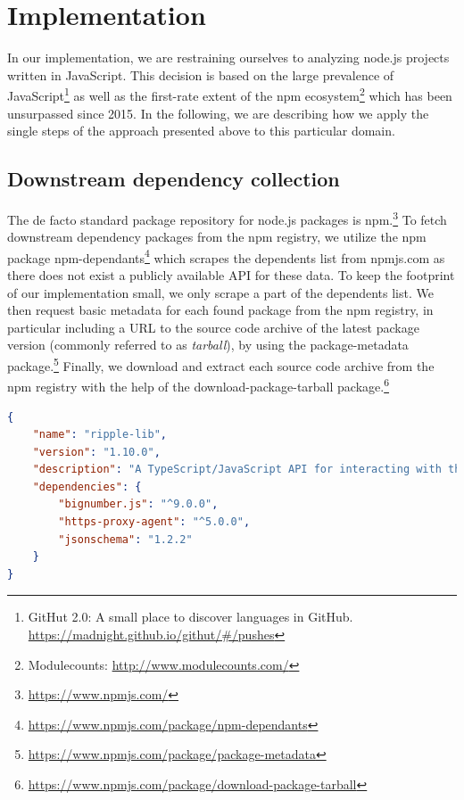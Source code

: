 \section{Implementation}
\label{sec:implementation}

In our implementation, we are restraining ourselves to analyzing node.js projects written in JavaScript.
This decision is based on the large prevalence of JavaScript\footnote{GitHut 2.0: A small place to discover languages in GitHub. \url{https://madnight.github.io/githut/\#/pushes}} as well as the first-rate extent of the npm ecosystem\footnote{Modulecounts: \url{http://www.modulecounts.com/}} which has been unsurpassed since 2015.
In the following, we are describing how we apply the single steps of the approach presented above to this particular domain.

\subsection{Downstream dependency collection}
\label{sec:implementation/dependency_collection}

The de facto standard package repository for node.js packages is npm.\footnote{\url{https://www.npmjs.com/}}
To fetch downstream dependency packages from the npm registry, we utilize the npm package npm-dependants\footnote{\url{https://www.npmjs.com/package/npm-dependants}} which scrapes the dependents list from npmjs.com as there does not exist a publicly available API for these data.
To keep the footprint of our implementation small, we only scrape a part of the dependents list.
We then request basic metadata for each found package from the npm registry, in particular including a URL to the source code archive of the latest package version (commonly referred to as \emph{tarball}), by using the package-metadata package.\footnote{\url{https://www.npmjs.com/package/package-metadata}}
Finally, we download and extract each source code archive from the npm registry with the help of the download-package-tarball package.\footnote{\url{https://www.npmjs.com/package/download-package-tarball}}

\begin{lstlisting}[language=json,
	label=sec:implementation/package.json,
	caption={An example \code{package.json} manifest file for the \code{ripple-lib} package specifying multiple dependencies (truncated).},
	float=tpb,
	floatplacement=tbp,
	abovecaptionskip=-5pt
]
{
	"name": "ripple-lib",
	"version": "1.10.0",
	"description": "A TypeScript/JavaScript API for interacting with the XRP Ledger",
	"dependencies": {
		"bignumber.js": "^9.0.0",
		"https-proxy-agent": "^5.0.0",
		"jsonschema": "1.2.2"
	}
}
\end{lstlisting}

